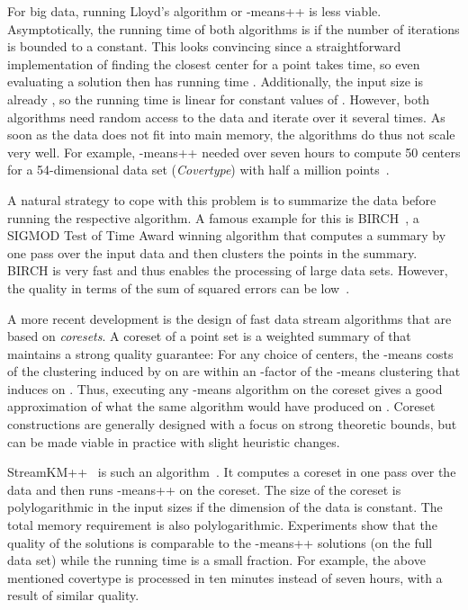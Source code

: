 \documentclass[a4paper]{scrartcl}
\begin{document}
For big data, running Lloyd's algorithm or -means++ is less viable. Asymptotically, the running time of both algorithms is  if the number of iterations is bounded to a constant. This looks convincing since a straightforward implementation of finding the closest center for a point takes  time, so even evaluating a solution then has running time . Additionally, the input size is already , so the running time is linear for constant values of . However, both algorithms need random access to the data and iterate over it several times. As soon as the data does not fit into main memory, the algorithms do thus not scale very well. For example, -means++ needed over seven hours to compute 50 centers for a 54-dimensional data set (\emph{Covertype}) with half a million points~\cite{AMRSLS12}.

A natural strategy to cope with this problem is to summarize the data before running the respective algorithm. A famous example for this is BIRCH~\cite{ZRL97}, a SIGMOD Test of Time Award winning algorithm that computes a summary by one pass over the input data and then clusters the points in the summary. BIRCH is very fast and thus enables the processing of large data sets. However, the quality in terms of the sum of squared errors can be low~\cite{AMRSLS12,FGSSS13}.

A more recent development is the design of fast data stream algorithms that are based on \emph{coresets}. A coreset  of a point set  is a weighted summary of  that maintains a strong quality guarantee: For any choice  of  centers, the -means costs of the clustering induced by  on  are within an  -factor of the -means clustering that  induces on . Thus, executing any -means algorithm on the coreset gives a good approximation of what the same algorithm would have produced on . Coreset constructions are generally designed with a focus on strong theoretic bounds, but can be made viable in practice with slight heuristic changes.

StreamKM++~ is such an algorithm~\cite{AMRSLS12}. It computes a coreset in one pass over the data and then runs -means++ on the coreset. The size of the coreset is polylogarithmic in the input sizes if the dimension of the data is constant. The total memory requirement is also polylogarithmic. Experiments show that the quality of the solutions is comparable to the -means++ solutions (on the full data set) while the running time is a small fraction. For example, the above mentioned covertype is processed in ten minutes instead of seven hours, with a result of similar quality.
\end{document}
